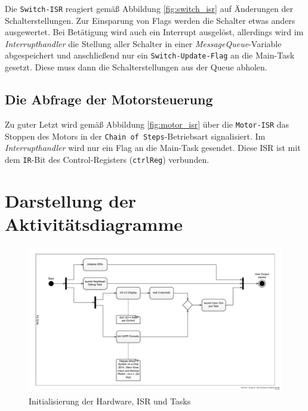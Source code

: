 \documentclass[ngerman,fontsize=12pt , paper=a4 , twoside=false , DIV12 , BCOR=1cm ,
numbers=enddot , listof=totoc , bibliography=totoc , index=totoc ,
headings=small , headlines=1.5 , final]{scrbook}
\begin{document}
Die \lstinline!Switch-ISR! reagiert gemäß Abbildung \ref{fig:switch_isr}
auf Änderungen der Schalterstellungen. Zur Einsparung von Flags werden
die Schalter etwas anders ausgewertet. Bei Betätigung wird auch ein
Interrupt ausgelöst, allerdings wird im \emph{Interrupthandler} die
Stellung aller Schalter in einer \emph{MessageQueue}-Variable
abgespeichert und anschließend nur ein \lstinline!Switch-Update-Flag! an
die Main-Task gesetzt. Diese muss dann die Schalterstellungen aus der
Queue abholen.

\subsection{Die Abfrage der
Motorsteuerung}\label{die-abfrage-der-motorsteuerung}

Zu guter Letzt wird gemäß Abbildung \ref{fig:motor_isr} über die
\lstinline!Motor-ISR! das Stoppen des Motors in der
\lstinline!Chain of Steps!-Betriebsart signalisiert. Im
\emph{Interrupthandler} wird nur ein Flag an die Main-Task gesendet.
Diese ISR ist mit dem \lstinline!IR!-Bit des Control-Registers
(\lstinline!ctrlReg!) verbunden.

\section{Darstellung der
Aktivitätsdiagramme}\label{darstellung-der-aktivituxe4tsdiagramme}

\begin{figure}[htbp]
\centering
\includegraphics{../Diagrams/Activities/Functions/Init.pdf}
\caption{Initialisierung der Hardware, ISR und Tasks\label{fig:init}}
\end{figure}
\end{document}
